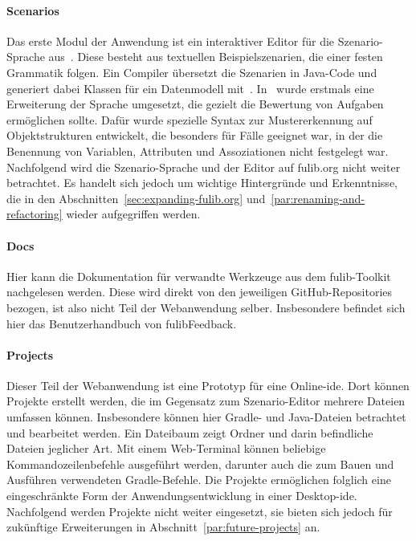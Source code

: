 \paragraph{Scenarios}
Das erste Modul der Anwendung ist ein interaktiver Editor für die Szenario-Sprache aus~\cite{explain}.
Diese besteht aus textuellen Beispielszenarien, die einer festen Grammatik folgen.
Ein Compiler übersetzt die Szenarien in Java-Code und generiert dabei Klassen für ein Datenmodell mit~\cite{fulib}.
In~\cite{bachelor-thesis} wurde erstmals eine Erweiterung der Sprache umgesetzt, die gezielt die Bewertung von Aufgaben ermöglichen sollte.
Dafür wurde spezielle Syntax zur Mustererkennung auf Objektstrukturen entwickelt, die besonders für Fälle geeignet war, in der die Benennung von Variablen, Attributen und Assoziationen nicht festgelegt war.
Nachfolgend wird die Szenario-Sprache und der Editor auf fulib.org nicht weiter betrachtet.
Es handelt sich jedoch um wichtige Hintergründe und Erkenntnisse, die in den Abschnitten~\ref{sec:expanding-fulib.org} und~\ref{par:renaming-and-refactoring} wieder aufgegriffen werden.

\paragraph{Docs}
Hier kann die Dokumentation für verwandte Werkzeuge aus dem fulib-Toolkit nachgelesen werden.
Diese wird direkt von den jeweiligen GitHub-Repositories bezogen, ist also nicht Teil der Webanwendung selber.
Insbesondere befindet sich hier das Benutzerhandbuch von fulibFeedback.

\paragraph{Projects}
Dieser Teil der Webanwendung ist eine Prototyp für eine Online-\ac{ide}.
Dort können Projekte erstellt werden, die im Gegensatz zum Szenario-Editor mehrere Dateien umfassen können.
Insbesondere können hier Gradle- und Java-Dateien betrachtet und bearbeitet werden.
Ein Dateibaum zeigt Ordner und darin befindliche Dateien jeglicher Art.
Mit einem Web-Terminal können beliebige Kommandozeilenbefehle ausgeführt werden, darunter auch die zum Bauen und Ausführen verwendeten Gradle-Befehle.
Die Projekte ermöglichen folglich eine eingeschränkte Form der Anwendungsentwicklung in einer Desktop-\ac{ide}.
Nachfolgend werden Projekte nicht weiter eingesetzt, sie bieten sich jedoch für zukünftige Erweiterungen in Abschnitt~\ref{par:future-projects} an.

